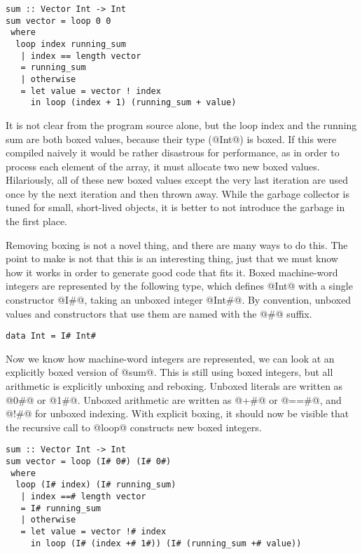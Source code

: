 \begin{lstlisting}
sum :: Vector Int -> Int
sum vector = loop 0 0
 where
  loop index running_sum
   | index == length vector
   = running_sum
   | otherwise
   = let value = vector ! index
     in loop (index + 1) (running_sum + value)
\end{lstlisting}

It is not clear from the program source alone, but the loop index and the running sum are both boxed values, because their type (@Int@) is boxed.
If this were compiled naively it would be rather disastrous for performance, as in order to process each element of the array, it must allocate two new boxed values.
Hilariously, all of these new boxed values except the very last iteration are used once by the next iteration and then thrown away.
While the garbage collector is tuned for small, short-lived objects, it is better to not introduce the garbage in the first place.

Removing boxing is not a novel thing, and there are many ways to do this.
The point to make is not that this is an interesting thing, just that we must know how it works in order to generate good code that fits it.
Boxed machine-word integers are represented by the following type, which defines @Int@ with a single constructor @I#@, taking an unboxed integer @Int#@. By convention, unboxed values and constructors that use them are named with the @#@ suffix.

\begin{lstlisting}
data Int = I# Int#
\end{lstlisting}

Now we know how machine-word integers are represented, we can look at an explicitly boxed version of @sum@.
This is still using boxed integers, but all arithmetic is explicitly unboxing and reboxing.
Unboxed literals are written as @0#@ or @1#@.
Unboxed arithmetic are written as @+#@ or @==#@, and @!#@ for unboxed indexing.
With explicit boxing, it should now be visible that the recursive call to @loop@ constructs new boxed integers.

\begin{lstlisting}
sum :: Vector Int -> Int
sum vector = loop (I# 0#) (I# 0#)
 where
  loop (I# index) (I# running_sum)
   | index ==# length vector
   = I# running_sum
   | otherwise
   = let value = vector !# index
     in loop (I# (index +# 1#)) (I# (running_sum +# value))
\end{lstlisting}

